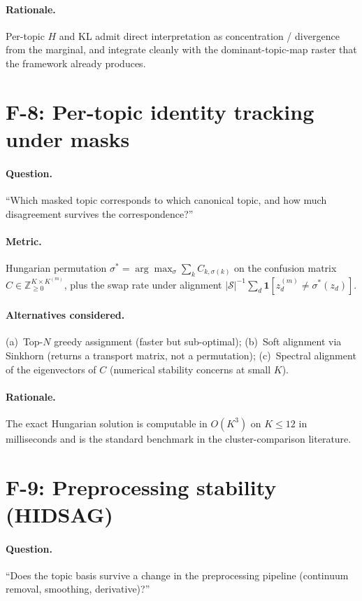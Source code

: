 \documentclass[11pt,a4paper]{article}
\begin{document}
\paragraph{Rationale.} Per-topic $H$ and KL admit direct
interpretation as concentration / divergence from the marginal,
and integrate cleanly with the dominant-topic-map raster that the
framework already produces.

\section{F-8: Per-topic identity tracking under masks}

\paragraph{Question.} ``Which masked topic corresponds to which
canonical topic, and how much disagreement survives the
correspondence?''

\paragraph{Metric.} Hungarian permutation $\sigma^* = \arg\max_\sigma
\sum_k C_{k, \sigma(k)}$ on the confusion matrix
$C \in \mathbb{Z}^{K \times K^{(m)}}_{\ge 0}$, plus the swap rate
under alignment $|\mathcal{S}|^{-1} \sum_d \mathbf{1}[z^{(m)}_d \ne
\sigma^*(z_d)]$.

\paragraph{Alternatives considered.} (a)~Top-$N$ greedy assignment
(faster but sub-optimal); (b)~Soft alignment via Sinkhorn (returns
a transport matrix, not a permutation); (c)~Spectral alignment of
the eigenvectors of $C$ (numerical stability concerns at small
$K$).

\paragraph{Rationale.} The exact Hungarian solution is computable
in $O(K^3)$ on $K \le 12$ in milliseconds and is the standard
benchmark in the cluster-comparison literature.

\section{F-9: Preprocessing stability (HIDSAG)}

\paragraph{Question.} ``Does the topic basis survive a change in
the preprocessing pipeline (continuum removal, smoothing,
derivative)?''
\end{document}
